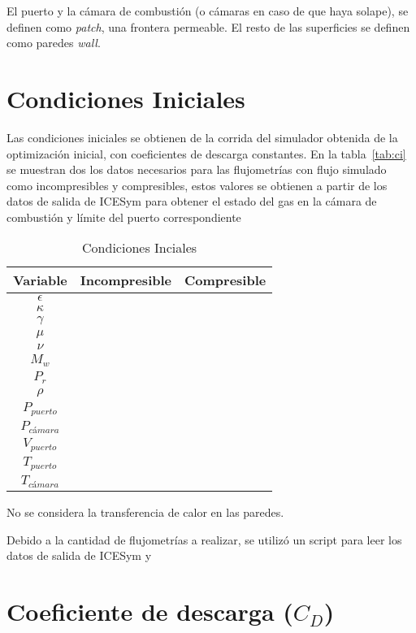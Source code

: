 El puerto y la cámara de combustión (o cámaras en caso de que haya solape), se
definen como \emph{patch}, una frontera permeable.
%
El resto de las superficies se definen como paredes \emph{wall}.


\section{Condiciones Iniciales}
%
Las condiciones iniciales se obtienen de la corrida del simulador obtenida de la
optimización inicial, con coeficientes de descarga constantes.
%
En la tabla~\ref{tab:ci} se muestran dos  los datos necesarios para las flujometrías
con flujo simulado como incompresibles y compresibles, estos valores se obtienen
a partir de los datos de salida de ICESym para obtener el estado del gas
en la cámara de combustión y límite del puerto correspondiente

\begin{table}
\centering
    \begin{tabular}{ccc} \toprule
      Variable & Incompresible & Compresible \\ \midrule
      $\epsilon$ & & \\
      $\kappa$ & & \\
      $\gamma$ & & \\
      $\mu$ & & \\
      $\nu$  & & \\
      $M_{w}$ & & \\
      $P_{r}$ & & \\
      $\rho$ & & \\
      $P_{puerto}$ & & \\
      $P_{cámara}$ & & \\
      $V_{puerto}$ & & \\
      $T_{puerto}$ & & \\
      $T_{cámara}$ & & \\

    \end{tabular}
    \caption{Condiciones Inciales}\label{tab:cc}
\end{table}

No se considera la transferencia de calor en las paredes.

Debido a la cantidad de flujometrías a realizar, se utilizó un script para leer
los datos de salida de ICESym y

\section{Coeficiente de descarga ($C_D$)}

